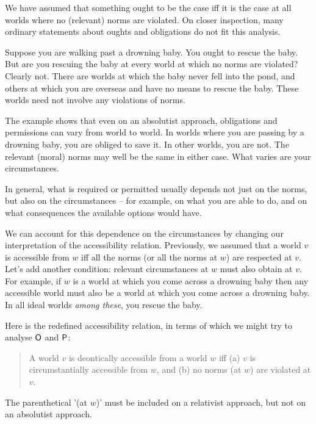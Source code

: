 We have assumed that something ought to be the case iff it is the case at all
worlds where no (relevant) norms are violated. On closer inspection, many
ordinary statements about oughts and obligations do not fit this analysis.

Suppose you are walking past a drowning baby. You ought to rescue the baby. But
are you rescuing the baby at every world at which no norms are violated? Clearly
not. There are worlds at which the baby never fell into the pond, and others at
which you are overseas and have no means to rescue the baby. These worlds need
not involve any violations of norms.

The example shows that even on an absolutist approach, obligations and
permissions can vary from world to world. In worlds where you are passing by a
drowning baby, you are obliged to save it. In other worlds, you are not. The
relevant (moral) norms may well be the same in either case. What varies are your
circumstances.

In general, what is required or permitted usually depends not just on the norms,
but also on the circumstances -- for example, on what you are able to do, and
on what consequences the available options would have.


We can account for this dependence on the circumstances by changing our
interpretation of the accessibility relation. Previously, we assumed that a
world $v$ is accessible from $w$ iff all the norms (or all the norms at $w$) are
respected at $v$. Let's add another condition: relevant circumstances at $w$
must also obtain at $v$. For example, if $w$ is a world at which you come across
a drowning baby then any accessible world must also be a world at which you come
across a drowning baby. In all ideal worlds \emph{among these}, you rescue the
baby.

Here is the redefined accessibility relation, in terms of which we might try to
analyse $\operatorname{\mathsf{O}}$ and $\operatorname{\mathsf{P}}$:
% 
\begin{quote}
  A world $v$ is deontically accessible from a world $w$ iff (a) $v$ is
  circumstantially accessible from $w$, and (b) no norms (at $w$) are violated
  at $v$.
\end{quote}
%
The parenthetical '(at $w$)' must be included on a relativist approach, but not
on an absolutist approach. 

